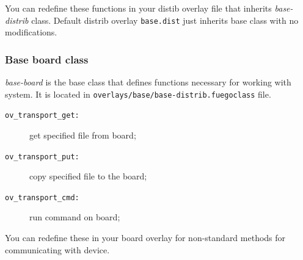You can redefine these functions in your distib overlay file that inherits \textit{base-distrib} class. Default distrib overlay \texttt{base.dist} just inherits base class with no modifications.

\subsubsection{Base board class}
\textit{base-board} is the base class that defines functions necessary for working with system. It is located in \texttt{overlays/base/base-distrib.fuegoclass} file.

\begin{description}
\item[\texttt{ov\_transport\_get:}] get specified file from board;
\item[\texttt{ov\_transport\_put:}] copy specified file to the board;
\item[\texttt{ov\_transport\_cmd:}] run command on board;
\end{description}

You can redefine these in your board overlay for non-standard methods for communicating with device.






